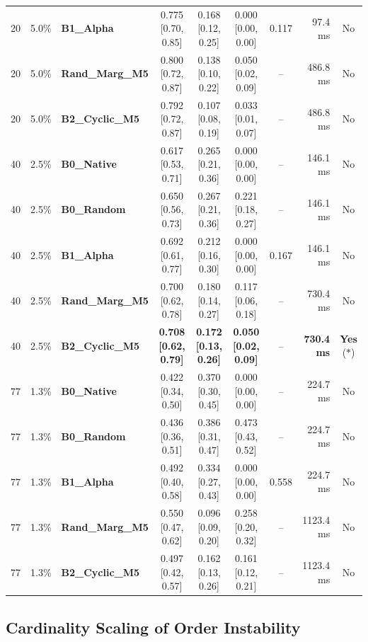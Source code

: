 \documentclass[10pt]{article}
\begin{document}
\begin{table}[t]
{\begin{tabular}{r r l c c c c r c}
20 & 5.0\% & \textbf{B1\_Alpha}  & 0.775 [0.70, 0.85] & 0.168 [0.12, 0.25] & 0.000 [0.00, 0.00] & 0.117 & 97.4 ms & No \\
20 & 5.0\% & \textbf{Rand\_Marg\_M5} & 0.800 [0.72, 0.87] & 0.138 [0.10, 0.22] & 0.050 [0.02, 0.09] & -- & 486.8 ms & No \\
20 & 5.0\% & \textbf{B2\_Cyclic\_M5} & 0.792 [0.72, 0.87] & 0.107 [0.08, 0.19] & 0.033 [0.01, 0.07] & -- & 486.8 ms & No \\
\midrule
40 & 2.5\% & \textbf{B0\_Native} & 0.617 [0.53, 0.71] & 0.265 [0.21, 0.36] & 0.000 [0.00, 0.00] & -- & 146.1 ms & No \\
40 & 2.5\% & \textbf{B0\_Random} & 0.650 [0.56, 0.73] & 0.267 [0.21, 0.36] & 0.221 [0.18, 0.27] & -- & 146.1 ms & No \\
40 & 2.5\% & \textbf{B1\_Alpha}  & 0.692 [0.61, 0.77] & 0.212 [0.16, 0.30] & 0.000 [0.00, 0.00] & 0.167 & 146.1 ms & No \\
40 & 2.5\% & \textbf{Rand\_Marg\_M5} & 0.700 [0.62, 0.78] & 0.180 [0.14, 0.27] & 0.117 [0.06, 0.18] & -- & 730.4 ms & No \\
40 & 2.5\% & \textbf{B2\_Cyclic\_M5} & \textbf{0.708 [0.62, 0.79]} & \textbf{0.172 [0.13, 0.26]} & \textbf{0.050 [0.02, 0.09]} & -- & \textbf{730.4 ms} & \textbf{Yes} ($*$) \\
\midrule
77 & 1.3\% & \textbf{B0\_Native} & 0.422 [0.34, 0.50] & 0.370 [0.30, 0.45] & 0.000 [0.00, 0.00] & -- & 224.7 ms & No \\
77 & 1.3\% & \textbf{B0\_Random} & 0.436 [0.36, 0.51] & 0.386 [0.31, 0.47] & 0.473 [0.43, 0.52] & -- & 224.7 ms & No \\
77 & 1.3\% & \textbf{B1\_Alpha}  & 0.492 [0.40, 0.58] & 0.334 [0.27, 0.43] & 0.000 [0.00, 0.00] & 0.558 & 224.7 ms & No \\
77 & 1.3\% & \textbf{Rand\_Marg\_M5} & 0.550 [0.47, 0.62] & 0.096 [0.09, 0.20] & 0.258 [0.20, 0.32] & -- & 1123.4 ms & No \\
77 & 1.3\% & \textbf{B2\_Cyclic\_M5} & 0.497 [0.42, 0.57] & 0.162 [0.13, 0.26] & 0.161 [0.12, 0.21] & -- & 1123.4 ms & No \\
\bottomrule
\end{tabular}%
}
\end{table}

\subsection{Cardinality Scaling of Order Instability}
\end{document}
